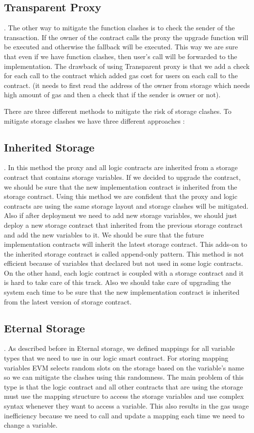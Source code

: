 \subsection{Transparent Proxy}. 
The other way to mitigate the function clashes is to check the sender of the transaction. If the owner of the contract calls the proxy the upgrade function will be executed and otherwise the fallback will be executed. This way we are sure that even if we have function clashes, then user's call will be forwarded to the implementation. 
The drawback of using Transparent proxy is that we add a check for each call to the contract which added gas cost for users on each call to the contract. (it needs to first read the address of the owner from storage which needs high amount of gas and then a check that if the sender is owner or not). 


There are three different methods to mitigate the risk of storage clashes.  To mitigate storage clashes we have three different approaches :

\subsection{Inherited Storage}. 
In this method the proxy and all logic contracts are inherited from a storage contract that contains storage variables. If we decided to upgrade the contract, we should be sure that the new implementation contract is inherited from the storage contract. Using this method we are confident that the proxy and logic contracts are using the same storage layout and storage clashes will be mitigated.
Also if after deployment we need to add new storage variables, we should just deploy a new storage contract that inherited from the previous storage contract and add the new variables to it. We should be sure that the future implementation contracts will inherit the latest storage contract. This adds-on to the inherited storage contract is called append-only pattern.
This method is not efficient because of variables that declared but not used in some logic contracts. On the other hand, each logic contract is coupled with a storage contract and it is hard to take care of this track. Also we should take care of upgrading the system each time to be sure that the new implementation contract is inherited from the latest version of storage contract.

\subsection{Eternal Storage}. 
As described before in Eternal storage, we defined mappings for all variable types that we need to use in our logic smart contract. For storing mapping variables EVM selects random slots on the storage based on the variable's name so we can mitigate the clashes using this randomness.
The main problem of this type is that the logic contract and all other contracts that are using the storage must use the mapping structure to access the storage variables and use complex syntax whenever they want to access a variable. This also results in the gas usage inefficiency because we need to call and update a mapping each time we need to change a variable.  


